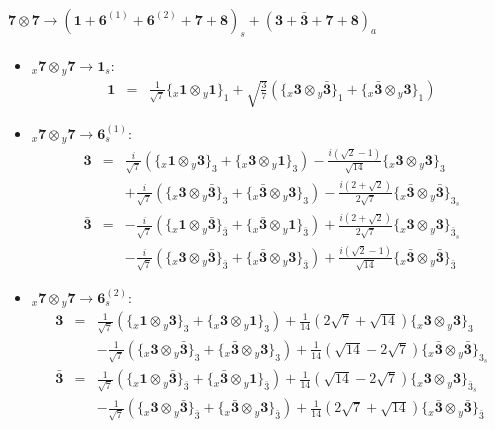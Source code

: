 \documentclass[english]{article}
\newcommand{\rep}[1]{\mathbf{#1}}
\newcommand{\repx}[2]{{}_{#2}\mathbf{#1}}
\newcommand{\subcg}[3]{\big\{ \repx{#1}{x}\otimes\repx{#2}{y}\big\}^{}_{#3}}
\begin{document}
\paragraph*{\Large $\rep{7}\otimes\rep{7}\to\left(\rep{1}+\rep{6}^{(1)}+\rep{6}^{(2)}+\rep{7}+\rep{8}\right)_s+\left(\rep{3}+\rep{\bar{3}}+\rep{7}+\rep{8}\right)_a$}
\begin{itemize}
\item $\repx{7}{x}\otimes\repx{7}{y}\to\rep{1}_{s}$:
\begin{eqnarray*}
\rep{1} &=& \frac{1}{\sqrt{7}}\subcg{1}{1}{1}+\sqrt{\frac{3}{7}}\left(\subcg{3}{\bar{3}}{1}+\subcg{\bar{3}}{3}{1}\right)
\end{eqnarray*}
\item $\repx{7}{x}\otimes\repx{7}{y}\to\rep{6}_{s}^{(1)}$:
\begin{eqnarray*}
\rep{3} &=& \frac{i}{\sqrt{7}}\left(\subcg{1}{3}{3}+\subcg{3}{1}{3}\right)-\frac{i \left(\sqrt{2}-1\right)}{\sqrt{14}}\subcg{3}{3}{3} \\ 
 & & +\frac{i}{\sqrt{7}}\left(\subcg{3}{\bar{3}}{3}+\subcg{\bar{3}}{3}{3}\right)-\frac{i \left(2+\sqrt{2}\right)}{2 \sqrt{7}}\subcg{\bar{3}}{\bar{3}}{3_{s}}
\\
\rep{\bar{3}} &=& -\frac{i}{\sqrt{7}}\left(\subcg{1}{\bar{3}}{\bar{3}}+\subcg{\bar{3}}{1}{\bar{3}}\right)+\frac{i \left(2+\sqrt{2}\right)}{2 \sqrt{7}}\subcg{3}{3}{\bar{3}_{s}} \\ 
 & & -\frac{i}{\sqrt{7}}\left(\subcg{3}{\bar{3}}{\bar{3}}+\subcg{\bar{3}}{3}{\bar{3}}\right)+\frac{i \left(\sqrt{2}-1\right)}{\sqrt{14}}\subcg{\bar{3}}{\bar{3}}{\bar{3}}
\end{eqnarray*}
\item $\repx{7}{x}\otimes\repx{7}{y}\to\rep{6}_{s}^{(2)}$:
\begin{eqnarray*}
\rep{3} &=& \frac{1}{\sqrt{7}}\left(\subcg{1}{3}{3}+\subcg{3}{1}{3}\right)+\frac{1}{14} \left(2 \sqrt{7}+\sqrt{14}\right)\subcg{3}{3}{3} \\ 
 & & -\frac{1}{\sqrt{7}}\left(\subcg{3}{\bar{3}}{3}+\subcg{\bar{3}}{3}{3}\right)+\frac{1}{14} \left(\sqrt{14}-2 \sqrt{7}\right)\subcg{\bar{3}}{\bar{3}}{3_{s}}
\\
\rep{\bar{3}} &=& \frac{1}{\sqrt{7}}\left(\subcg{1}{\bar{3}}{\bar{3}}+\subcg{\bar{3}}{1}{\bar{3}}\right)+\frac{1}{14} \left(\sqrt{14}-2 \sqrt{7}\right)\subcg{3}{3}{\bar{3}_{s}} \\ 
 & & -\frac{1}{\sqrt{7}}\left(\subcg{3}{\bar{3}}{\bar{3}}+\subcg{\bar{3}}{3}{\bar{3}}\right)+\frac{1}{14} \left(2 \sqrt{7}+\sqrt{14}\right)\subcg{\bar{3}}{\bar{3}}{\bar{3}}

\end{eqnarray*}
\end{itemize}
\end{document}
